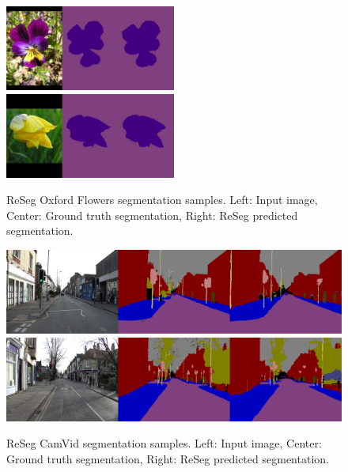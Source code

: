 \begin{figure}[t!]
    \centering
    \includegraphics[width=0.5\textwidth]{img/reseg/samples/flowers1.jpg}\\
    \vspace{0.1em}
    \includegraphics[width=0.5\textwidth]{img/reseg/samples/flowers2.jpg}
    \caption{ReSeg Oxford Flowers segmentation samples.
        Left: Input image, Center: Ground truth segmentation,
        Right: ReSeg predicted segmentation.}
    \label{fig:reseg_samples_flowers}
\end{figure}

\begin{figure}[t!]
    \centering
    \includegraphics[width=\textwidth]{img/reseg/samples/camvid1.png}\\
    \vspace{0.1em}
    \includegraphics[width=\textwidth]{img/reseg/samples/camvid2.png}
    \caption{ReSeg CamVid segmentation samples.
        Left: Input image, Center: Ground truth segmentation,
        Right: ReSeg predicted segmentation.}
    \label{fig:reseg_samples_camvid}
\end{figure}


